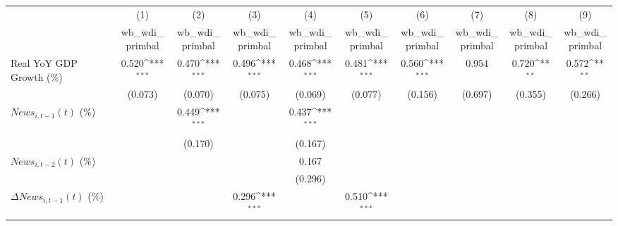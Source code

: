 {
\def\sym#1{\ifmmode^{#1}\else\(^{#1}\)\fi}
\begin{tabular}{l*{9}{c}}
\toprule
                    &\multicolumn{1}{c}{(1)}&\multicolumn{1}{c}{(2)}&\multicolumn{1}{c}{(3)}&\multicolumn{1}{c}{(4)}&\multicolumn{1}{c}{(5)}&\multicolumn{1}{c}{(6)}&\multicolumn{1}{c}{(7)}&\multicolumn{1}{c}{(8)}&\multicolumn{1}{c}{(9)}\\
                    &\multicolumn{1}{c}{wb_wdi_primbal}&\multicolumn{1}{c}{wb_wdi_primbal}&\multicolumn{1}{c}{wb_wdi_primbal}&\multicolumn{1}{c}{wb_wdi_primbal}&\multicolumn{1}{c}{wb_wdi_primbal}&\multicolumn{1}{c}{wb_wdi_primbal}&\multicolumn{1}{c}{wb_wdi_primbal}&\multicolumn{1}{c}{wb_wdi_primbal}&\multicolumn{1}{c}{wb_wdi_primbal}\\
\midrule
Real YoY GDP Growth (\%)&       0.520\sym{***}&       0.470\sym{***}&       0.496\sym{***}&       0.468\sym{***}&       0.481\sym{***}&       0.560\sym{***}&       0.954         &       0.720\sym{**} &       0.572\sym{**} \\
                    &     (0.073)         &     (0.070)         &     (0.075)         &     (0.069)         &     (0.077)         &     (0.156)         &     (0.697)         &     (0.355)         &     (0.266)         \\
\addlinespace
$ News_{i,t-1}(t)$ (\%)&                     &       0.449\sym{***}&                     &       0.437\sym{***}&                     &                     &                     &                     &                     \\
                    &                     &     (0.170)         &                     &     (0.167)         &                     &                     &                     &                     &                     \\
\addlinespace
$ News_{i,t-2}(t)$ (\%)&                     &                     &                     &       0.167         &                     &                     &                     &                     &                     \\
                    &                     &                     &                     &     (0.296)         &                     &                     &                     &                     &                     \\
\addlinespace
$ \Delta News_{i,t-1}(t)$ (\%)&                     &                     &       0.296\sym{***}&                     &       0.510\sym{***}&                     &                     &                     &                     \\

\end{tabular}}
